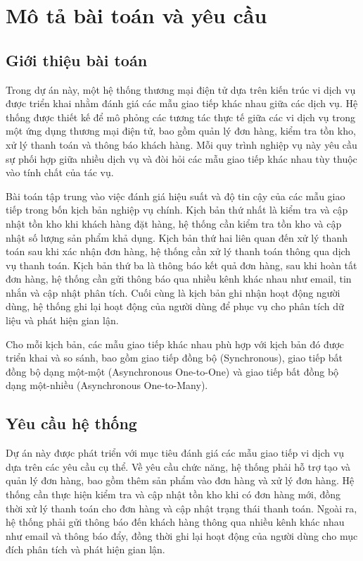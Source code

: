 \section{Mô tả bài toán và yêu cầu}

\subsection{Giới thiệu bài toán}
Trong dự án này, một hệ thống thương mại điện tử dựa trên kiến trúc vi dịch vụ được triển khai nhằm đánh giá các mẫu giao tiếp khác nhau giữa các dịch vụ. Hệ thống được thiết kế để mô phỏng các tương tác thực tế giữa các vi dịch vụ trong một ứng dụng thương mại điện tử, bao gồm quản lý đơn hàng, kiểm tra tồn kho, xử lý thanh toán và thông báo khách hàng. Mỗi quy trình nghiệp vụ này yêu cầu sự phối hợp giữa nhiều dịch vụ và đòi hỏi các mẫu giao tiếp khác nhau tùy thuộc vào tính chất của tác vụ.

Bài toán tập trung vào việc đánh giá hiệu suất và độ tin cậy của các mẫu giao tiếp trong bốn kịch bản nghiệp vụ chính. Kịch bản thứ nhất là kiểm tra và cập nhật tồn kho khi khách hàng đặt hàng, hệ thống cần kiểm tra tồn kho và cập nhật số lượng sản phẩm khả dụng. Kịch bản thứ hai liên quan đến xử lý thanh toán sau khi xác nhận đơn hàng, hệ thống cần xử lý thanh toán thông qua dịch vụ thanh toán. Kịch bản thứ ba là thông báo kết quả đơn hàng, sau khi hoàn tất đơn hàng, hệ thống cần gửi thông báo qua nhiều kênh khác nhau như email, tin nhắn và cập nhật phân tích. Cuối cùng là kịch bản ghi nhận hoạt động người dùng, hệ thống ghi lại hoạt động của người dùng để phục vụ cho phân tích dữ liệu và phát hiện gian lận.

Cho mỗi kịch bản, các mẫu giao tiếp khác nhau phù hợp với kịch bản đó được triển khai và so sánh, bao gồm giao tiếp đồng bộ (Synchronous), giao tiếp bất đồng bộ dạng một-một (Asynchronous One-to-One) và giao tiếp bất đồng bộ dạng một-nhiều (Asynchronous One-to-Many).

\subsection{Yêu cầu hệ thống}
Dự án này được phát triển với mục tiêu đánh giá các mẫu giao tiếp vi dịch vụ dựa trên các yêu cầu cụ thể. Về yêu cầu chức năng, hệ thống phải hỗ trợ tạo và quản lý đơn hàng, bao gồm thêm sản phẩm vào đơn hàng và xử lý đơn hàng. Hệ thống cần thực hiện kiểm tra và cập nhật tồn kho khi có đơn hàng mới, đồng thời xử lý thanh toán cho đơn hàng và cập nhật trạng thái thanh toán. Ngoài ra, hệ thống phải gửi thông báo đến khách hàng thông qua nhiều kênh khác nhau như email và thông báo đẩy, đồng thời ghi lại hoạt động của người dùng cho mục đích phân tích và phát hiện gian lận.

